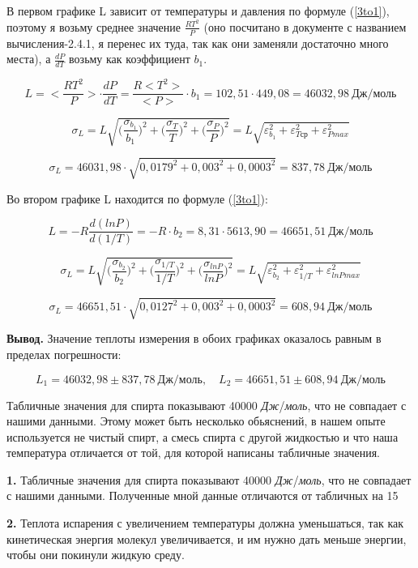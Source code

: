 \documentclass[12pt,a4paper]{article}
\begin{document}
В первом графике L зависит от температуры и давления по формуле (\ref{3to1}), поэтому я возьму среднее значение $\frac{RT^2}{P}$ (оно посчитано в документе с названием вычисления-2.4.1, я перенес их туда, так как они заменяли достаточно много места), а $\frac{dP}{dT}$ возьму как коэффициент $b_1$.

\[L = <\frac{RT^2}{P}> \cdot \frac{dP}{dT} = \frac{R<T^2>}{<P>} \cdot b_1 = 102,51 \cdot 449,08 = 46032,98 \: \textit{Дж}/ \textit{моль}\]

\[\sigma_L = L \sqrt{\Big( \frac{\sigma_{b_1}}{b_1}\Big)^2 + \Big( \frac{\sigma_T }{T}\Big)^2 + \Big( \frac{\sigma_P}{P}\Big)^2} = L\sqrt{\varepsilon_{b_1}^2 + \varepsilon_{T\textit{ср}}^2 + \varepsilon_{P\textit{max}}^2}\]

\[\sigma_L = 46031,98 \cdot \sqrt{0,0179^2+0,003^2 + 0,0003^2} = 837,78 \: \textit{Дж}/ \textit{моль}\]

\vspace{0.5cm}

Во втором графике L находится по формуле (\ref{3to1}):

\[L = -R\frac{d(lnP)}{d(1/T)} = -R \cdot b_2 = 8,31 \cdot 5613,90 = 46651,51 \: \textit{Дж}/ \textit{моль}\]

\[\sigma_L = L \sqrt{\Big( \frac{\sigma_{b_2}}{b_2}\Big)^2 + \Big( \frac{\sigma_{1/T} }{1/T}\Big)^2 + \Big( \frac{\sigma_{lnP}}{lnP}\Big)^2} = L\sqrt{\varepsilon_{b_2}^2 + \varepsilon_{1/T}^2 + \varepsilon_{lnP\textit{max}}^2}\]

\[\sigma_L = 46651,51 \cdot \sqrt{0,0127^2+0,003^2 + 0,0003^2} = 608,94 \: \textit{Дж}/ \textit{моль}\]

\vspace{0.5cm}

\textbf{Вывод.} Значение теплоты измерения в обоих графиках оказалось равным в пределах погрешности:

\[L_1 = 46032,98 \pm 837,78 \: \textit{Дж}/ \textit{моль}, \quad L_2 = 46651,51 \pm 608,94 \: \textit{Дж}/ \textit{моль}\]

Табличные значения для спирта показывают 40000 \textit{Дж}/\textit{моль}, что не совпадает с нашими данными. Этому может быть несколько обьяснений, в нашем опыте используется не чистый спирт, а смесь спирта с другой жидкостью и что наша температура отличается от той, для которой написаны табличные значения.

\vspace{0.5cm}

\textbf{1.} Табличные значения для спирта показывают 40000 \textit{Дж}/\textit{моль}, что не совпадает с нашими данными. Полученные мной данные отличаются от табличных на 15%

\vspace{0.5cm}

\textbf{2.} Теплота испарения с увеличением температуры должна уменьшаться, так как кинетическая энергия молекул увеличивается, и им нужно дать меньше энергии, чтобы они покинули жидкую среду.
\end{document}
